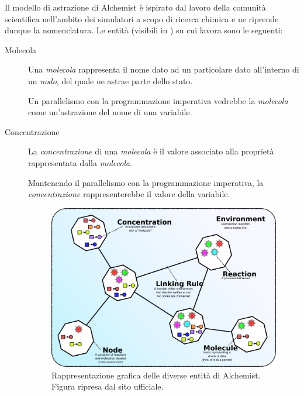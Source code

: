     Il modello di astrazione di Alchemist è ispirato dal lavoro della comunità scientifica nell'ambito dei simulatori a scopo di ricerca chimica e ne riprende dunque la nomenclatura.
    Le entità (visibili in ) su cui lavora sono le seguenti:

    \begin{description}
      \item[Molecola]\label{itm:mol}
        Una \emph{molecola} rappresenta il nome dato ad un particolare dato all'interno di un \emph{nodo}, del quale ne astrae parte dello stato.

        Un parallelismo con la programmazione imperativa vedrebbe la \emph{molecola} come un'astrazione del nome di una variabile.

      \item[Concentrazione]\label{itm:conc}
        La \emph{concentrazione} di una \emph{molecola} è il valore associato alla proprietà rappresentata dalla \emph{molecola}.

        Mantenendo il parallelismo con la programmazione imperativa, la \emph{concentrazione} rappresenterebbe il valore della variabile.

        \begin{figure}[tbp] %
          \centering
          \includegraphics[width=.85\textwidth]{res/fig/alchemist_model.png}
          \caption[%
            Rappresentazione grafica delle diverse entità di Alchemist.
          ]{%
            Rappresentazione grafica delle diverse entità di Alchemist.\\
            Figura ripresa dal sito ufficiale\protect\footnotemark.
          }%
          \label{fig:alchemist:model}
        \end{figure}


\end{description}
